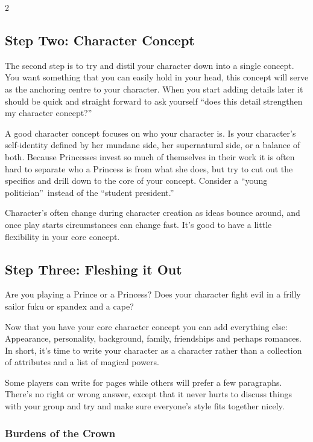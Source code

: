 \begin{multicols}{2}
\subsection*{Step Two: Character Concept}

The second step is to try and distil your character down into a single concept. You want something that you can easily hold in your head, this concept will serve as the anchoring centre to your character. When you start adding details later it should be quick and straight forward to ask yourself  \textquotedblleft does this detail strengthen my character concept?\textquotedblright 

A good character concept focuses on who your character is. Is your character's self-identity defined by her mundane side, her supernatural side, or a balance of both. Because Princesses invest so much of themselves in their work it is often hard to separate who a Princess is from what she does, but try to cut out the specifics and drill down to the core of your concept. Consider a \textquotedblleft young politician\textquotedblright\, instead of the \textquotedblleft student president.\textquotedblright  

Character's often change during character creation as ideas bounce around, and once play starts circumstances can change fast. It's good to have a little flexibility in your core concept. 

\subsection*{Step Three: Fleshing it Out}

Are you playing a Prince or a Princess? Does your character fight evil in a frilly sailor fuku or spandex and a cape? 

Now that you have your core character concept you can add everything else: Appearance, personality, background, family, friendships and perhaps romances. In short, it's time to write your character as a character rather than a collection of attributes and a list of magical powers. 

Some players can write for pages while others will prefer a few paragraphs. There's no right or wrong answer, except that it never hurts to discuss things with your group and try and make sure everyone's style fits together nicely.  


\begin{mybox}


\subsubsection*{Burdens of the Crown}


\end{mybox}
\end{multicols}

